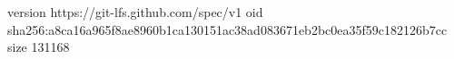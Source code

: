 version https://git-lfs.github.com/spec/v1
oid sha256:a8ca16a965f8ae8960b1ca130151ac38ad083671eb2bc0ea35f59c182126b7cc
size 131168
